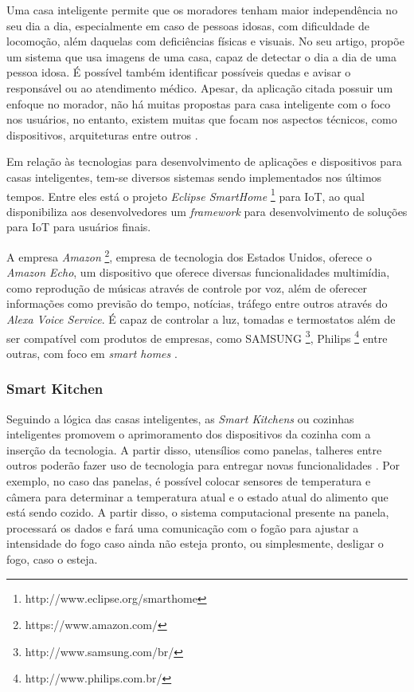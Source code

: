 Uma casa inteligente permite que os moradores tenham maior independência no seu dia a dia, especialmente em caso de pessoas idosas, com dificuldade de locomoção, além daquelas com deficiências físicas e visuais.
No seu artigo,  propõe um sistema que usa imagens de uma casa, capaz de detectar o dia a dia de uma pessoa idosa. É possível também identificar possíveis quedas e avisar o responsável ou ao atendimento médico. Apesar, da aplicação citada possuir um enfoque no morador, não há muitas propostas para casa inteligente com o foco nos usuários, no entanto, existem muitas que focam nos aspectos técnicos, como dispositivos, arquiteturas entre outros \cite{Wilson2015}.


Em relação às tecnologias para desenvolvimento de aplicações e dispositivos para casas inteligentes, tem-se diversos sistemas sendo implementados nos últimos tempos. Entre eles está o projeto \textit{Eclipse SmartHome} \textsuperscript{\texttrademark}
\footnote{http://www.eclipse.org/smarthome} para IoT, ao qual disponibiliza aos desenvolvedores um \textit{framework} para desenvolvimento de soluções para IoT para usuários finais. 
    

A empresa \textit{Amazon} \textsuperscript{\textregistered}
\footnote{https://www.amazon.com/}, empresa de tecnologia dos Estados Unidos, oferece o \textit{Amazon Echo}, um dispositivo que oferece diversas funcionalidades multimídia, como reprodução de músicas através de controle por voz, além de oferecer informações como previsão do tempo, notícias, tráfego entre outros através do \textit{Alexa Voice Service}. É capaz de controlar a luz, tomadas e termostatos além de ser compatível com produtos de empresas, como SAMSUNG\textsuperscript{\textregistered}
\footnote{http://www.samsung.com/br/}, Philips{\textregistered}
\footnote{http://www.philips.com.br/} entre outras, com foco em \textit{smart homes} \cite{amazon2017}.

\subsubsection{Smart Kitchen}

Seguindo a lógica das casas inteligentes, as \textit{Smart Kitchens} ou cozinhas inteligentes promovem o aprimoramento dos dispositivos da cozinha com a inserção da tecnologia. A partir disso, utensílios como panelas, talheres entre outros poderão fazer uso de tecnologia para entregar novas funcionalidades \cite{Staender2012}. Por exemplo, no caso das panelas, é possível colocar sensores de temperatura e câmera para determinar a temperatura atual e o estado atual do alimento que está sendo cozido. A partir disso, o sistema computacional presente na panela, processará os dados e fará uma comunicação com o fogão para ajustar a intensidade do fogo caso ainda não esteja pronto, ou simplesmente, desligar o fogo, caso o esteja. 

